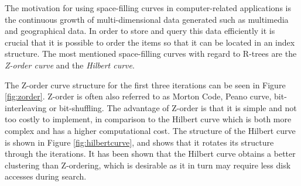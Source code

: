 \noindent
The motivation for using space-filling curves in computer-related applications is the continuous growth of multi-dimensional data generated such as multimedia and geographical data. In order to store and query this data efficiently it is crucial that it is possible to order the items so that it can be located in an index structure. The most mentioned space-filling curves with regard to R-trees are the \emph{Z-order curve} and the \emph{Hilbert curve}. \newline

\noindent
The Z-order curve structure for the first three iterations can be seen in Figure \ref{fig:zorder}. Z-order is often also referred to as Morton Code, Peano curve, bit-interleaving or bit-shuffling\cite{performanceSFC}\cite{fractKeyRetri}. The advantage of Z-order is that it is simple and not too costly to implement, in comparison to the Hilbert curve which is both more complex and has a higher computational cost. The structure of the Hilbert curve is shown in Figure \ref{fig:hilbertcurve}, and shows that it rotates its structure through the iterations. It has been shown that the Hilbert curve obtains a better clustering than Z-ordering\cite{AnalysisHilbert}\cite{fractKeyRetri}, which is desirable as it in turn may require less disk accesses during search. 

